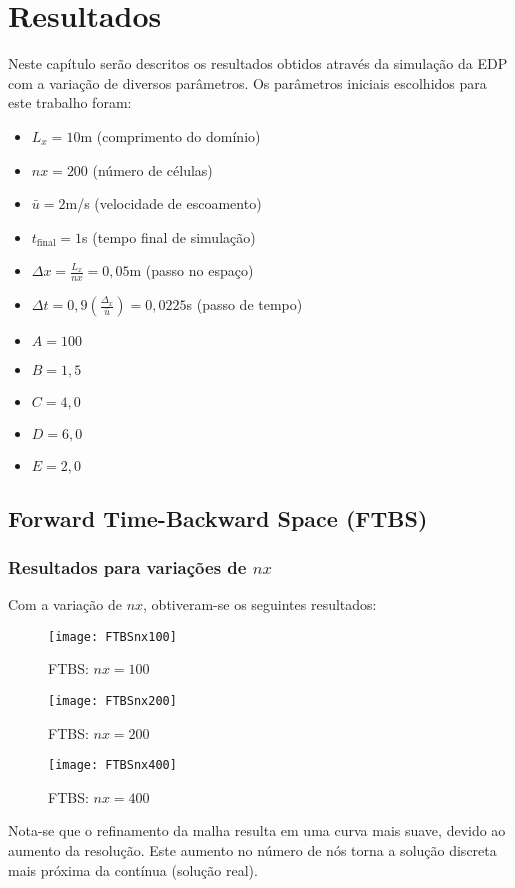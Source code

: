 \chapter{Resultados}
Neste capítulo serão descritos os resultados obtidos através da simulação da
EDP com a variação de diversos parâmetros. Os parâmetros iniciais escolhidos
para este trabalho foram:
\begin{itemize}
    \item $L_x = 10$m (comprimento do domínio)
    \item $nx = 200$ (número de células)
    \item $\bar{u} = 2$m/s (velocidade de escoamento)
    \item $t_\text{final} = 1$s  (tempo final de simulação)
    \item $\Delta x = \frac{L_x}{nx} = 0,05$m (passo no espaço)
    \item $\Delta t = 0,9\left( \frac{\Delta_x}{\bar{u}} \right) = 0,0225$s
          (passo de tempo)
    \item $A = 100$
    \item $B = 1,5$
    \item $C = 4,0$
    \item $D = 6,0$
    \item $E = 2,0$
\end{itemize}

\section{Forward Time-Backward Space (FTBS)}

\subsection{Resultados para variações de $nx$}
Com a variação de $nx$, obtiveram-se os seguintes resultados:
\begin{figure}[H]
    \centering
    \texttt{[image: FTBSnx100]}
    \caption{FTBS: $nx = 100$}
\end{figure}
\begin{figure}[H]
    \centering
    \texttt{[image: FTBSnx200]}
    \caption{FTBS: $nx = 200$}
\end{figure}
\begin{figure}[H]
    \centering
    \texttt{[image: FTBSnx400]}
    \caption{FTBS: $nx = 400$}
\end{figure}
Nota-se que o refinamento da malha resulta em uma curva mais suave, devido ao
aumento da resolução. Este aumento no número de nós torna a solução discreta
mais próxima da contínua (solução real).

